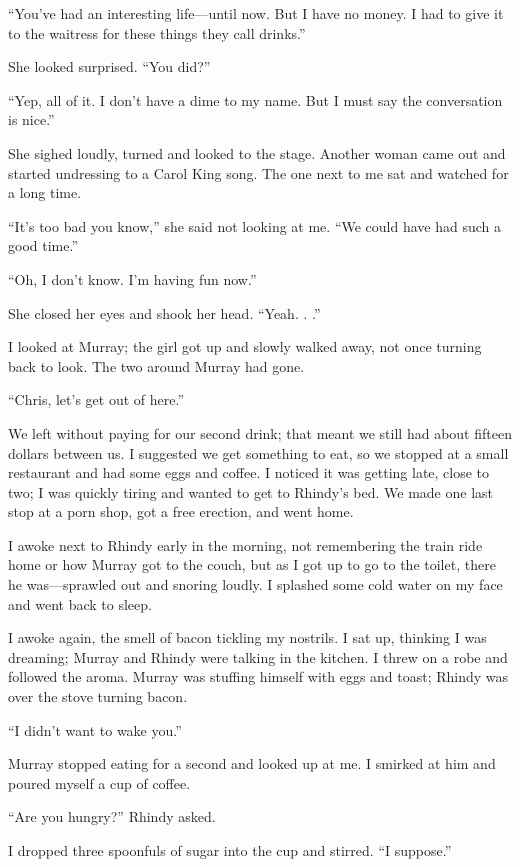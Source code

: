 ``You've had an interesting life---until now. But I have no money. I had
to give it to the waitress for these things they call drinks.''

She looked surprised. ``You did?''

``Yep, all of it. I don't have a dime to my name. But I must say the
conversation is nice.''

She sighed loudly, turned and looked to the stage. Another woman came
out and started undressing to a Carol King song. The one next to me sat
and watched for a long time.

``It's too bad you know,'' she said not looking at me. ``We could have
had such a good time.''

``Oh, I don't know. I'm having fun now.''

She closed her eyes and shook her head. ``Yeah. . .''

I looked at Murray; the girl got up and slowly walked away, not once
turning back to look. The two around Murray had gone.

``Chris, let's get out of here.''

We left without paying for our second drink; that meant we still had
about fifteen dollars between us. I suggested we get something to eat,
so we stopped at a small restaurant and had some eggs and coffee. I
noticed it was getting late, close to two; I was quickly tiring and
wanted to get to Rhindy's bed. We made one last stop at a porn shop, got
a free erection, and went home.

I awoke next to Rhindy early in the morning, not remembering the train
ride home or how Murray got to the couch, but as I got up to go to the
toilet, there he was---sprawled out and snoring loudly. I splashed some
cold water on my face and went back to sleep.

I awoke again, the smell of bacon tickling my nostrils. I sat up,
thinking I was dreaming; Murray and Rhindy were talking in the kitchen.
I threw on a robe and followed the aroma. Murray was stuffing himself
with eggs and toast; Rhindy was over the stove turning bacon.

``I didn't want to wake you.''

Murray stopped eating for a second and looked up at me. I smirked at him
and poured myself a cup of coffee.

``Are you hungry?'' Rhindy asked.

I dropped three spoonfuls of sugar into the cup and stirred. ``I
suppose.''

